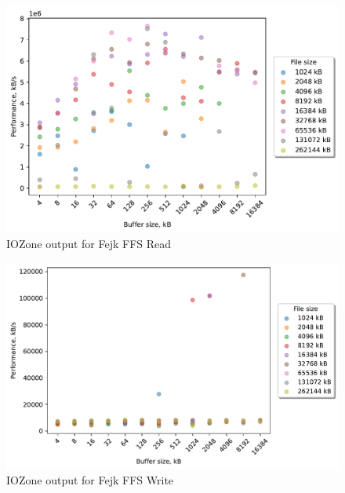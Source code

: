 \begin{figure}[!htb]
	\label{fig:bench_fffs_read}
	\begin{center}
		\includegraphics[width=1.0\textwidth]{figures/benchmarking/fejk-ffs/Read.pdf}
	\end{center}
	\caption{IOZone output for Fejk FFS Read}
\end{figure}

\begin{figure}[!htb]
	\label{fig:bench_fffs_write}
	\begin{center}
		\includegraphics[width=1.0\textwidth]{figures/benchmarking/fejk-ffs/Write.pdf}
	\end{center}
	\caption{IOZone output for Fejk FFS Write}
\end{figure}

